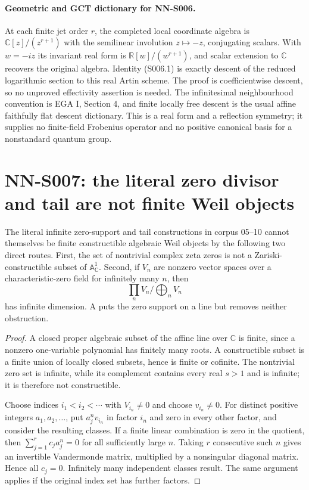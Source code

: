 \paragraph{Geometric and GCT dictionary for NN-S006.}
At each finite jet order $r$, the completed local coordinate
algebra is $\mathbb C[z]/(z^{r+1})$ with the semilinear involution
$z\mapsto-z$, conjugating scalars. With $w=-iz$ its invariant
real form is $\mathbb R[w]/(w^{r+1})$, and scalar extension to
$\mathbb C$ recovers the original algebra. Identity (S006.1)
is exactly descent of the reduced logarithmic section to this
real Artin scheme. The proof is coefficientwise descent, so no
unproved effectivity assertion is needed. The infinitesimal
neighbourhood convention is EGA I, Section 4, and finite locally
free descent is the usual affine faithfully flat descent
dictionary. This is a real form and a reflection symmetry;
it supplies no finite-field Frobenius operator and no positive
canonical basis for a nonstandard quantum group.



\section{NN-S007: the literal zero divisor and tail are not finite Weil objects}
\label{sec:NN-S007}

\begin{theorem}[NN-S007]
The literal infinite zero-support and tail constructions in
corpus 05--10 cannot themselves be finite constructible
algebraic Weil objects by the following two direct routes.
First, the set of nontrivial complex zeta zeros is not a
Zariski-constructible subset of $\mathbb A^1_{\mathbb C}$.
Second, if $V_n$ are nonzero vector spaces over a characteristic-zero
field for infinitely many $n$, then
\[
 \prod_nV_n\big/\bigoplus_nV_n
\]
has infinite dimension. A puts the zero support on a line but
removes neither obstruction.
\end{theorem}

\begin{proof}
A closed proper algebraic subset of the affine line over
$\mathbb C$ is finite, since a nonzero one-variable polynomial
has finitely many roots. A constructible subset is a finite union
of locally closed subsets, hence is finite or cofinite. The
nontrivial zero set is infinite, while its complement contains
every real $s>1$ and is infinite; it is therefore not constructible.

Choose indices $i_1<i_2<\cdots$ with $V_{i_n}\ne0$ and
choose $v_{i_n}\ne0$. For distinct positive integers
$a_1,a_2,\ldots$, put $a_j^nv_{i_n}$ in factor $i_n$ and zero
in every other factor, and consider the resulting classes. If a finite linear
combination is zero in the quotient, then
$\sum_{j=1}^rc_ja_j^n=0$ for all sufficiently large $n$.
Taking $r$ consecutive such $n$ gives an invertible Vandermonde
matrix, multiplied by a nonsingular diagonal matrix. Hence all
$c_j=0$. Infinitely many independent classes result. The same
argument applies if the original index set has further factors.
\end{proof}

